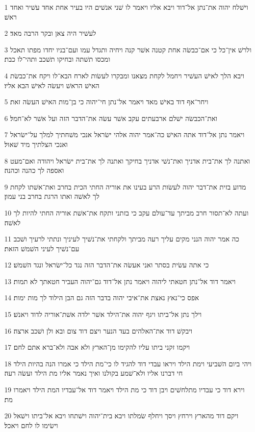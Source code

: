 \par 1 וישׁלח יהוה את־נתן אל־דוד ויבא אליו ויאמר לו שׁני אנשׁים היו בעיר אחת אחד עשׁיר ואחד ראשׁ׃
\par 2 לעשׁיר היה צאן ובקר הרבה מאד׃
\par 3 ולרשׁ אין־כל כי אם־כבשׂה אחת קטנה אשׁר קנה ויחיה ותגדל עמו ועם־בניו יחדו מפתו תאכל ומכסו תשׁתה ובחיקו תשׁכב ותהי־לו כבת׃
\par 4 ויבא הלך לאישׁ העשׁיר ויחמל לקחת מצאנו ומבקרו לעשׂות לארח הבא־לו ויקח את־כבשׂת האישׁ הראשׁ ויעשׂה לאישׁ הבא אליו׃
\par 5 ויחר־אף דוד באישׁ מאד ויאמר אל־נתן חי־יהוה כי בן־מות האישׁ העשׂה זאת׃
\par 6 ואת־הכבשׂה ישׁלם ארבעתים עקב אשׁר עשׂה את־הדבר הזה ועל אשׁר לא־חמל׃
\par 7 ויאמר נתן אל־דוד אתה האישׁ כה־אמר יהוה אלהי ישׂראל אנכי משׁחתיך למלך על־ישׂראל ואנכי הצלתיך מיד שׁאול׃
\par 8 ואתנה לך את־בית אדניך ואת־נשׁי אדניך בחיקך ואתנה לך את־בית ישׂראל ויהודה ואם־מעט ואספה לך כהנה וכהנה׃
\par 9 מדוע בזית את־דבר יהוה לעשׂות הרע בעינו את אוריה החתי הכית בחרב ואת־אשׁתו לקחת לך לאשׁה ואתו הרגת בחרב בני עמון׃
\par 10 ועתה לא־תסור חרב מביתך עד־עולם עקב כי בזתני ותקח את־אשׁת אוריה החתי להיות לך לאשׁה׃
\par 11 כה אמר יהוה הנני מקים עליך רעה מביתך ולקחתי את־נשׁיך לעיניך ונתתי לרעיך ושׁכב עם־נשׁיך לעיני השׁמשׁ הזאת׃
\par 12 כי אתה עשׂית בסתר ואני אעשׂה את־הדבר הזה נגד כל־ישׂראל ונגד השׁמשׁ׃
\par 13 ויאמר דוד אל־נתן חטאתי ליהוה ויאמר נתן אל־דוד גם־יהוה העביר חטאתך לא תמות׃
\par 14 אפס כי־נאץ נאצת את־איבי יהוה בדבר הזה גם הבן הילוד לך מות ימות׃
\par 15 וילך נתן אל־ביתו ויגף יהוה את־הילד אשׁר ילדה אשׁת־אוריה לדוד ויאנשׁ׃
\par 16 ויבקשׁ דוד את־האלהים בעד הנער ויצם דוד צום ובא ולן ושׁכב ארצה׃
\par 17 ויקמו זקני ביתו עליו להקימו מן־הארץ ולא אבה ולא־ברא אתם לחם׃
\par 18 ויהי ביום השׁביעי וימת הילד ויראו עבדי דוד להגיד לו כי־מת הילד כי אמרו הנה בהיות הילד חי דברנו אליו ולא־שׁמע בקולנו ואיך נאמר אליו מת הילד ועשׂה רעה׃
\par 19 וירא דוד כי עבדיו מתלחשׁים ויבן דוד כי מת הילד ויאמר דוד אל־עבדיו המת הילד ויאמרו מת׃
\par 20 ויקם דוד מהארץ וירחץ ויסך ויחלף שׂמלתו ויבא בית־יהוה וישׁתחו ויבא אל־ביתו וישׁאל וישׂימו לו לחם ויאכל׃
